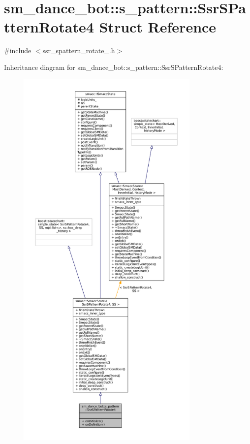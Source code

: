 \hypertarget{structsm__dance__bot_1_1s__pattern_1_1SsrSPatternRotate4}{}\section{sm\+\_\+dance\+\_\+bot\+:\+:s\+\_\+pattern\+:\+:Ssr\+S\+Pattern\+Rotate4 Struct Reference}
\label{structsm__dance__bot_1_1s__pattern_1_1SsrSPatternRotate4}


{\ttfamily \#include $<$ssr\+\_\+spattern\+\_\+rotate\+\_.\+h$>$}



Inheritance diagram for sm\+\_\+dance\+\_\+bot\+:\+:s\+\_\+pattern\+:\+:Ssr\+S\+Pattern\+Rotate4\+:
\nopagebreak
\begin{figure}[H]
\begin{center}
\leavevmode
\includegraphics[height=550pt]{structsm__dance__bot_1_1s__pattern_1_1SsrSPatternRotate4__inherit__graph}
\end{center}
\end{figure}


